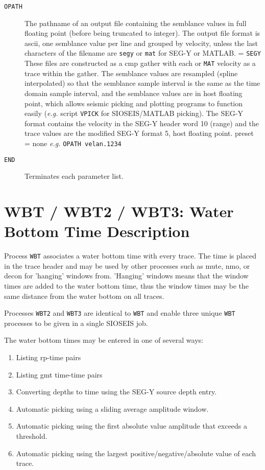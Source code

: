 \begin{description}
\item[\texttt{OPATH}] The pathname of an output file containing the semblance values
         in full floating point (before being truncated to integer).
         The output file format is \gls{ascii}, one semblance value per line
         and grouped by velocity, unless the last characters of
         the filename are \texttt{segy} or \texttt{mat} for SEG-Y or MATLAB.
  = \texttt{SEGY} These files are constructed as a \gls{cmp} \gls{gather} with each
 or \texttt{MAT}  velocity as a trace within the \gls{gather}.  The semblance values
         are resampled (spline interpolated) so that the semblance
         sample interval is the same as the time domain sample interval,
         and the semblance values are in host floating point, which
         allows seismic picking and plotting programs to function
         easily (\textit{e.g.} script \texttt{VPICK} for SIOSEIS/MATLAB picking).  The
         SEG-Y format contains the velocity in the SEG-Y header word 10
         (range) and the trace values are the modified SEG-Y format 5,
         host floating point.
         \Gls{preset} = none  \textit{e.g.}  \texttt{OPATH velan.1234}

\item[\texttt{END}] Terminates each parameter list.
\end{description}

\section{WBT / WBT2 / WBT3: Water Bottom Time Description}
\label{cmd_wbt}

Process \texttt{WBT} associates a water bottom time with every trace.  The time
is placed in the trace header and may be used by other processes
such as mute, nmo, or decon for 'hanging' windows from. 'Hanging'
windows means that the window times are added to the water bottom time,
thus the window times may be the same distance from the water bottom on
all traces.

Processes \texttt{WBT2} and \texttt{WBT3} are identical to \texttt{WBT} and enable three unique
\texttt{WBT} processes to be given in a single SIOSEIS job.

The water bottom times may be entered in one of several ways:
\begin{enumerate}
\item Listing rp-time pairs
\item Listing \gls{gmt} time-time pairs
\item Converting depths to time using the SEG-Y source depth entry.
\item Automatic picking using a sliding average amplitude window.
\item Automatic picking using the first absolute value amplitude that exceeds a threshold.
\item Automatic picking using the largest positive/negative/absolute value of each trace.
\end{enumerate}

